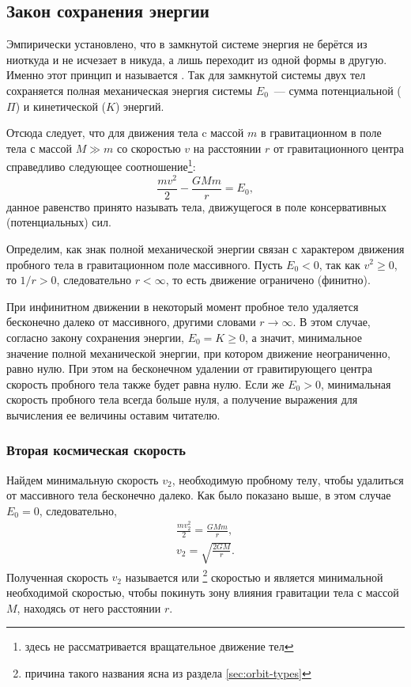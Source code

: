 \subsection{Закон сохранения энергии}

Эмпирически установлено, что в замкнутой системе энергия не берётся из ниоткуда и не исчезает в никуда, а лишь переходит из одной формы в другую. Именно этот принцип и называется . Так для замкнутой системы двух тел сохраняется полная механическая энергия системы $E_0$~--- сумма потенциальной ($\Pi$) и кинетической ($K$) энергий.

Отсюда следует, что для движения тела c массой $m$ в гравитационном  в поле тела
с массой $M\gg m$ со скоростью $v$ на расстоянии $r$ от
гравитационного центра справедливо следующее соотношение\footnote{здесь не рассматривается вращательное движение тел}:
\begin{equation}
    \frac{m v^2}{2}-\frac{GM m }{r}=E_0,
\end{equation}
данное равенство принято называть  тела, движущегося в поле консервативных (потенциальных) сил.

Определим, как знак полной механической энергии связан с характером движения пробного тела в гравитационном поле массивного. Пусть $E_0 < 0$, так как $v^2 \geqslant 0$, то $1/r > 0$, следовательно $r < \infty$, то есть движение ограничено (финитно).

При инфинитном движении в некоторый момент пробное тело удаляется бесконечно далеко от массивного, другими словами $r \rightarrow \infty$. В этом случае, согласно закону сохранения энергии, $E_0 = K \geqslant 0$, а значит, минимальное значение полной механической энергии, при котором движение неограниченно, равно нулю. При этом на бесконечном удалении от гравитирующего центра скорость пробного тела также будет равна нулю. Если же $E_0 > 0$, минимальная скорость пробного тела всегда больше нуля, а получение выражения для вычисления ее величины оставим читателю.

\subsubsection*{Вторая космическая скорость}

Найдем минимальную скорость $v_2$, необходимую пробному телу, чтобы удалиться от массивного тела бесконечно далеко. Как было показано выше, в этом случае $E_0 = 0$, следовательно,
\begin{gather}
    \frac{mv_2^2}{2} = \frac{GMm}{r}, \nonumber \\
    v_2 = \sqrt{\frac{2GM}{r}}.
\end{gather}
Полученная скорость $v_2$ называется  или \footnote{причина такого названия ясна из раздела \ref{sec:orbit-types}} скоростью и является минимальной необходимой скоростью, чтобы покинуть зону влияния гравитации тела с массой $M$, находясь от него расстоянии $r$.
